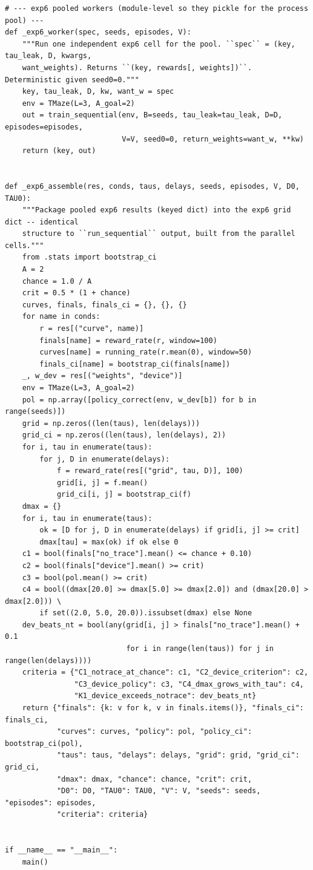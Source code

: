 \begin{lstlisting}[caption={mrl\_trace/maze.py},label={lst:siox-src-maze}]
# --- exp6 pooled workers (module-level so they pickle for the process pool) ---
def _exp6_worker(spec, seeds, episodes, V):
    """Run one independent exp6 cell for the pool. ``spec`` = (key, tau_leak, D, kwargs,
    want_weights). Returns ``(key, rewards[, weights])``. Deterministic given seed0=0."""
    key, tau_leak, D, kw, want_w = spec
    env = TMaze(L=3, A_goal=2)
    out = train_sequential(env, B=seeds, tau_leak=tau_leak, D=D, episodes=episodes,
                           V=V, seed0=0, return_weights=want_w, **kw)
    return (key, out)


def _exp6_assemble(res, conds, taus, delays, seeds, episodes, V, D0, TAU0):
    """Package pooled exp6 results (keyed dict) into the exp6 grid dict -- identical
    structure to ``run_sequential`` output, built from the parallel cells."""
    from .stats import bootstrap_ci
    A = 2
    chance = 1.0 / A
    crit = 0.5 * (1 + chance)
    curves, finals, finals_ci = {}, {}, {}
    for name in conds:
        r = res[("curve", name)]
        finals[name] = reward_rate(r, window=100)
        curves[name] = running_rate(r.mean(0), window=50)
        finals_ci[name] = bootstrap_ci(finals[name])
    _, w_dev = res[("weights", "device")]
    env = TMaze(L=3, A_goal=2)
    pol = np.array([policy_correct(env, w_dev[b]) for b in range(seeds)])
    grid = np.zeros((len(taus), len(delays)))
    grid_ci = np.zeros((len(taus), len(delays), 2))
    for i, tau in enumerate(taus):
        for j, D in enumerate(delays):
            f = reward_rate(res[("grid", tau, D)], 100)
            grid[i, j] = f.mean()
            grid_ci[i, j] = bootstrap_ci(f)
    dmax = {}
    for i, tau in enumerate(taus):
        ok = [D for j, D in enumerate(delays) if grid[i, j] >= crit]
        dmax[tau] = max(ok) if ok else 0
    c1 = bool(finals["no_trace"].mean() <= chance + 0.10)
    c2 = bool(finals["device"].mean() >= crit)
    c3 = bool(pol.mean() >= crit)
    c4 = bool((dmax[20.0] >= dmax[5.0] >= dmax[2.0]) and (dmax[20.0] > dmax[2.0])) \
        if set((2.0, 5.0, 20.0)).issubset(dmax) else None
    dev_beats_nt = bool(any(grid[i, j] > finals["no_trace"].mean() + 0.1
                            for i in range(len(taus)) for j in range(len(delays))))
    criteria = {"C1_notrace_at_chance": c1, "C2_device_criterion": c2,
                "C3_device_policy": c3, "C4_dmax_grows_with_tau": c4,
                "K1_device_exceeds_notrace": dev_beats_nt}
    return {"finals": {k: v for k, v in finals.items()}, "finals_ci": finals_ci,
            "curves": curves, "policy": pol, "policy_ci": bootstrap_ci(pol),
            "taus": taus, "delays": delays, "grid": grid, "grid_ci": grid_ci,
            "dmax": dmax, "chance": chance, "crit": crit,
            "D0": D0, "TAU0": TAU0, "V": V, "seeds": seeds, "episodes": episodes,
            "criteria": criteria}


if __name__ == "__main__":
    main()
\end{lstlisting}

